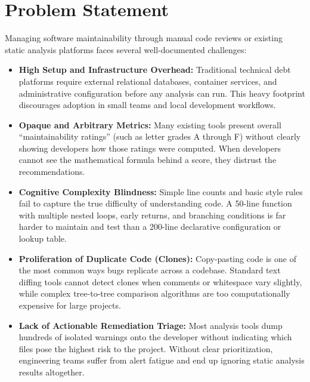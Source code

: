 \section{Problem Statement}
Managing software maintainability through manual code reviews or existing static analysis platforms faces several well-documented challenges:
\begin{itemize}
    \item \textbf{High Setup and Infrastructure Overhead:} Traditional technical debt platforms require external relational databases, container services, and administrative configuration before any analysis can run. This heavy footprint discourages adoption in small teams and local development workflows.
    \item \textbf{Opaque and Arbitrary Metrics:} Many existing tools present overall ``maintainability ratings'' (such as letter grades A through F) without clearly showing developers how those ratings were computed. When developers cannot see the mathematical formula behind a score, they distrust the recommendations.
    \item \textbf{Cognitive Complexity Blindness:} Simple line counts and basic style rules fail to capture the true difficulty of understanding code. A 50-line function with multiple nested loops, early returns, and branching conditions is far harder to maintain and test than a 200-line declarative configuration or lookup table.
    \item \textbf{Proliferation of Duplicate Code (Clones):} Copy-pasting code is one of the most common ways bugs replicate across a codebase. Standard text diffing tools cannot detect clones when comments or whitespace vary slightly, while complex tree-to-tree comparison algorithms are too computationally expensive for large projects.
    \item \textbf{Lack of Actionable Remediation Triage:} Most analysis tools dump hundreds of isolated warnings onto the developer without indicating which files pose the highest risk to the project. Without clear prioritization, engineering teams suffer from alert fatigue and end up ignoring static analysis results altogether.
\end{itemize}

